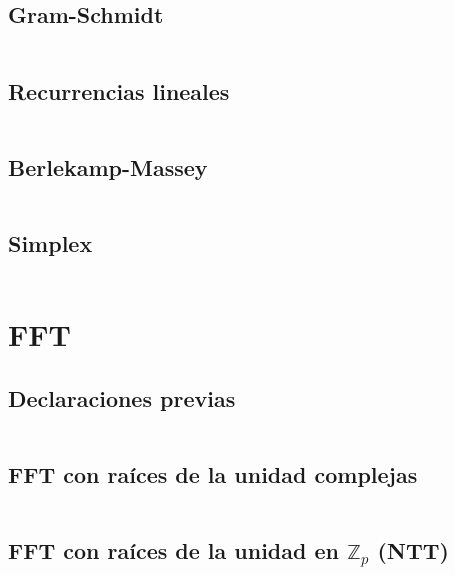 \documentclass[11pt]{article}
\begin{document}
		\subsection{Gram-Schmidt}
		\inputminted[tabsize=2,breaklines,firstline=299,lastline=315,fontsize=\small]{c++}{matrix.cpp}
		
		\subsection{Recurrencias lineales}
		\inputminted[tabsize=2,breaklines,firstline=7,lastline=33,fontsize=\small]{c++}{recurrence.cpp}
		
		\subsection{Berlekamp-Massey}
		\inputminted[tabsize=2,breaklines,firstline=46,lastline=81,fontsize=\small]{c++}{recurrence.cpp}
		
		\subsection{Simplex}
		\inputminted[tabsize=2,breaklines,fontsize=\small]{c++}{simplex.cpp}
		
		
	\newpage
	\section{FFT}
		\subsection{Declaraciones previas}
		\inputminted[tabsize=2,breaklines,firstline=3,lastline=11,fontsize=\small]{c++}{fft.cpp}
		
		\subsection{FFT con raíces de la unidad complejas}
		\inputminted[tabsize=2,breaklines,firstline=13,lastline=34,fontsize=\small]{c++}{fft.cpp}
		
		\subsection{FFT con raíces de la unidad en $\mathbb{Z}_p$ (NTT)}
		\inputminted[tabsize=2,breaklines,firstline=36,lastline=83,fontsize=\small]{c++}{fft.cpp}
\end{document}
